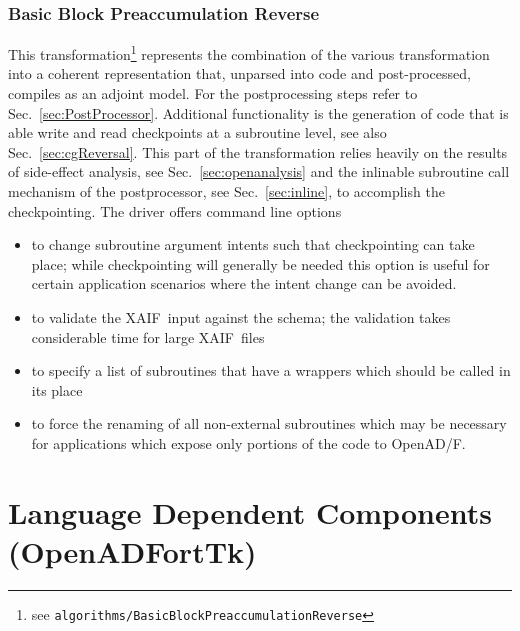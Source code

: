 \documentclass{book}
\newcommand{\OpenADF}{OpenAD/F}
\newcommand{\OpenADFortTk}{OpenADFortTk}
\newcommand{\xaif}{XAIF}
\newcommand{\refsec}[1]{{Sec.~\ref{#1}}}
\begin{document}
\subsubsection{Basic Block Preaccumulation Reverse}\label{sec:BBRev}

This transformation\footnote{
  see \lstinline{algorithms/BasicBlockPreaccumulationReverse}
}
represents the combination of the various transformation 
into a coherent representation that, unparsed into code and post-processed, compiles 
as an adjoint model. 
For the postprocessing steps refer to \refsec{sec:PostProcessor}.
Additional functionality is the generation of code that is able write and 
read checkpoints at a subroutine level, see also \refsec{sec:cgReversal}. 
This part of the transformation relies heavily on the results of side-effect analysis, see 
\refsec{sec:openanalysis} and the inlinable subroutine call mechanism of 
the postprocessor, see \refsec{sec:inline}, to accomplish the checkpointing. 
The driver offers command line options
\begin{itemize}
\item to change subroutine argument intents 
  such that checkpointing can take place; while checkpointing will 
  generally be needed this option is useful 
  for certain application scenarios where the intent change can be avoided.
\item  to validate the \xaif\ input against the schema; the validation takes 
  considerable time for large \xaif\ files
\item to specify a list of subroutines 
  that have a wrappers which should be called in its place
\item to force the renaming of all non-external subroutines which may be necessary 
  for applications which expose only portions of the code to \OpenADF.
\end{itemize}

\section{Language Dependent Components (\OpenADFortTk)}\label{sec:fortfe}
\end{document}
